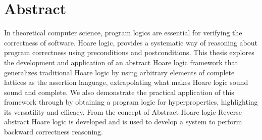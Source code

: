 {}
\begingroup

\chapter*{Abstract}

In theoretical computer science, program logics are essential for verifying the 
correctness of software. Hoare logic, provides a systematic way of reasoning 
about program correctness using preconditions and postconditions. This thesis 
explores the development and application of an abstract Hoare logic framework 
that generalizes traditional Hoare logic by using arbitrary elements of complete
lattices as the assertion language, extrapolating what makes Hoare logic sound
sound and complete. We also demonstrate the practical application of this 
framework through by obtaining a program logic for hyperproperties, 
highlighting its versatility and efficacy. From the concept of Abstract Hoare 
logic Reverse abstract Hoare logic is developed and is used to develop a system
to perform backward correctness reasoning.

\vfill
